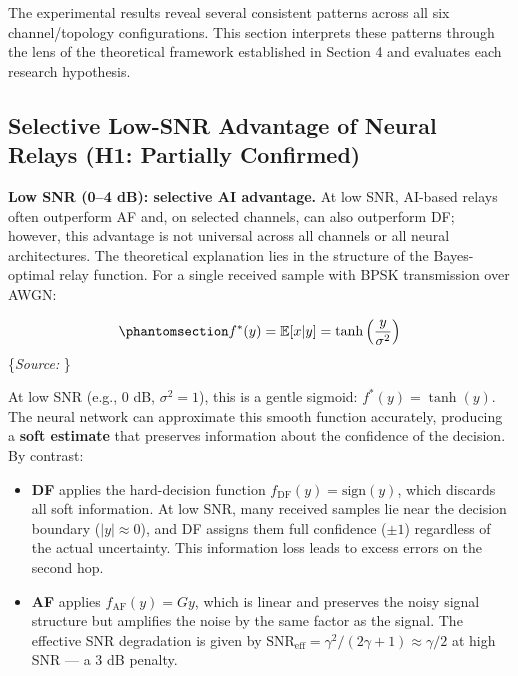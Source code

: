 \documentclass[
  english,
  12pt,
  12pt,
  a4paper,
  oneside]{report}
\begin{document}
The experimental results reveal several consistent patterns across all six channel/topology configurations. This section interprets these patterns through the lens of the theoretical framework established in Section 4 and evaluates each research hypothesis.

\subsection{Selective Low-SNR Advantage of Neural Relays (H1: Partially Confirmed)}\label{sec:selective-low-snr-advantage-of-neural-relays-h1-partially-confirmed}

\textbf{Low SNR (0--4 dB): selective AI advantage.} At low SNR, AI-based relays often outperform AF and, on selected channels, can also outperform DF; however, this advantage is not universal across all channels or all neural architectures. The theoretical explanation lies in the structure of the Bayes-optimal relay function. For a single received sample with BPSK transmission over AWGN:

\begin{equation}\protect\phantomsection\label{eq:optimal-denoiser-relay}{f^*(y) = \mathbb{E}[x | y] = \tanh\left(\frac{y}{\sigma^2}\right)
}\end{equation} \footnotesize\{\textit{Source: \1}\}\normalsize

At low SNR (e.g., 0 dB, \(\sigma^2 = 1\)), this is a gentle sigmoid: \(f^*(y) = \tanh(y)\). The neural network can approximate this smooth function accurately, producing a \textbf{soft estimate} that preserves information about the confidence of the decision. By contrast:

\begin{itemize}
\item
  \textbf{DF} applies the hard-decision function \(f_{\text{DF}}(y) = \text{sign}(y)\), which discards all soft information. At low SNR, many received samples lie near the decision boundary (\(|y| \approx 0\)), and DF assigns them full confidence (\(\pm 1\)) regardless of the actual uncertainty. This information loss leads to excess errors on the second hop.
\item
  \textbf{AF} applies \(f_{\text{AF}}(y) = Gy\), which is linear and preserves the noisy signal structure but amplifies the noise by the same factor as the signal. The effective SNR degradation is given by \(\text{SNR}_{\text{eff}} = \gamma^2 / (2\gamma + 1) \approx \gamma/2\) at high SNR --- a 3 dB penalty.
\end{itemize}
\end{document}
